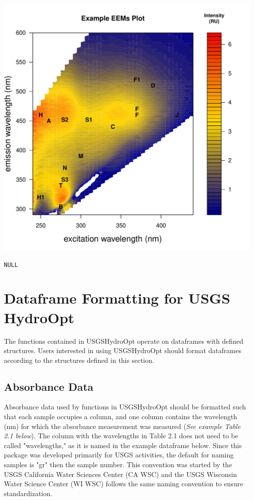 \documentclass[a4paper,11pt]{article}\usepackage[]{graphicx}\usepackage[]{color}
\makeatletter
\def\maxwidth{ %
  \ifdim\Gin@nat@width>\linewidth
    \linewidth
  \else
    \Gin@nat@width
  \fi
}
\newenvironment{kframe}{%
 \def\at@end@of@kframe{}%
 \ifinner\ifhmode%
  \def\at@end@of@kframe{\end{minipage}}%
  \begin{minipage}{\columnwidth}%
 \fi\fi%
 \def\FrameCommand##1{\hskip\@totalleftmargin \hskip-\fboxsep
 \colorbox{shadecolor}{##1}\hskip-\fboxsep
     \hskip-\linewidth \hskip-\@totalleftmargin \hskip\columnwidth}%
 \MakeFramed {\advance\hsize-\width
   \@totalleftmargin\z@ \linewidth\hsize
   \@setminipage}}%
 {\par\unskip\endMakeFramed%
 \at@end@of@kframe}
\newenvironment{knitrout}{}{} %
\makeatother
\begin{document}
\begin{knitrout}
\color{fgcolor}
\includegraphics[width=\maxwidth]{figure/unnamed-chunk-3} 
\begin{kframe}\begin{verbatim}
NULL
\end{verbatim}
\end{kframe}
\end{knitrout}

\section{Dataframe Formatting for USGS HydroOpt}
The functions contained in USGSHydroOpt operate on dataframes with defined structures. Users interested in using USGSHydroOpt should format dataframes according to the structures defined in this section.

\subsection{Absorbance Data}
Absorbance data used by functions in USGSHydroOpt should be formatted such that each sample occupies a column, and one column contains the wavelength (nm) for which the absorbance measurement was measured (\emph{See example Table 2.1 below}). The column with the wavelengths in Table 2.1 does not need to be called "wavelengths," as it is named in the example dataframe below. Since this package was developed primarily for USGS activities, the default for naming samples is "gr" then the sample number. This convention was started by the USGS California Water Sciences Center (CA WSC) and the USGS Wisconsin Water Science Center (WI WSC) follows the same naming convention to ensure standardization.
\end{document}
